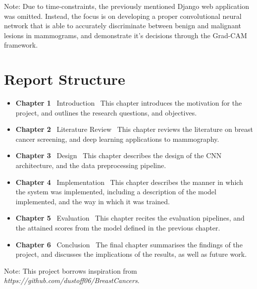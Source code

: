 \documentclass[main]{subfiles}
\begin{document}
\noindent Note: Due to time-constraints, the previously mentioned Django web application was omitted. Instead, the focus is on developing a proper convolutional neural network that is able to accurately discriminate between benign and malignant lesions in mammograms, and demonstrate it's decisions through the Grad-CAM framework.

\section{Report Structure}
\label{sec:intro_report_structure}
\begin{itemize}
	\item \textbf{Chapter 1} \textemdash\ Introduction \textemdash\ This chapter introduces the motivation for the project, and outlines the research questions, and objectives.
	\item \textbf{Chapter 2} \textemdash\ Literature Review \textemdash\ This chapter reviews the literature on breast cancer screening, and deep learning applications to mammography.
	\item \textbf{Chapter 3} \textemdash\ Design \textemdash\ This chapter describes the design of the CNN architecture, and the data preprocessing pipeline.
	\item \textbf{Chapter 4} \textemdash\ Implementation \textemdash\ This chapter describes the manner in which the system was implemented, including a description of the model implemented, and the way in which it was trained.
	\item \textbf{Chapter 5} \textemdash\ Evaluation \textemdash\ This chapter recites the evaluation pipelines, and the attained scores from the model defined in the previous chapter.
	\item \textbf{Chapter 6} \textemdash\ Conclusion \textemdash\ The final chapter summarises the findings of the project, and discusses the implications of the results, as well as future work.
\end{itemize}


\noindent Note: This project borrows inspiration from \textit{https://github.com/dustoff06/BreastCancers}.
\end{document}
